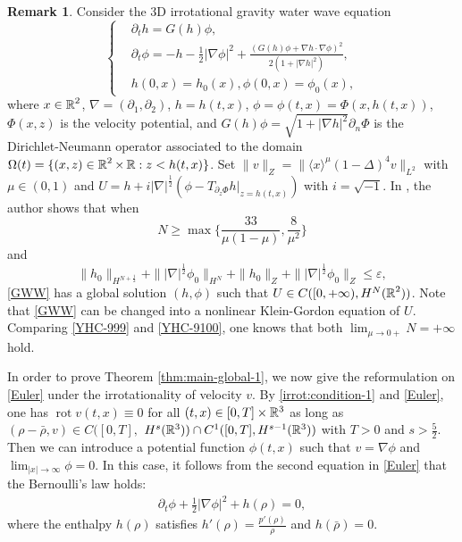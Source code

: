 \documentclass[11pt,twoside]{article}
\def\na{\nabla}
\def\R{\mathop{\mathbb R\kern 0pt}\nolimits}
\def\ds{\displaystyle}
\def\f{\frac}
\def\p{\partial}
\def\ve{\varepsilon}
\newcommand{\w}[1]{\langle {#1} \rangle}
\DeclareMathOperator{\rot}{rot}
\theoremstyle{plain}
\theoremstyle{definition}
\theoremstyle{assumption}
\newtheorem{remark}{Remark}[section]
\numberwithin{equation}{section}
\begin{document}
\begin{remark}\label{YHC-90E}
Consider the 3D irrotational gravity water wave equation
\begin{equation}\label{GWW}
\left\{
\begin{aligned}
&\p_th=G(h)\phi,\\
&\p_t\phi=-h-\frac12|\nabla\phi|^2
+\frac{(G(h)\phi+\nabla h\cdot\nabla\phi)^2}{2(1+|\nabla h|^2)},\\
&h(0,x)=h_0(x), \phi(0,x)=\phi_0(x),
\end{aligned}
\right.
\end{equation}
where $x\in\R^2$, $\nabla=(\p_1,\p_2)$, $h=h(t,x)$, $\phi=\phi(t,x)=\Phi(x,h(t,x))$, $\Phi(x,z)$
is the velocity potential, and $G(h)\phi=\sqrt{1+|\na h|^2}\p_n\Phi$
is the Dirichlet-Neumann operator associated to the domain $\Omega(t)=\{(x,z)\in\R^2\times\R: z<h(t,x)\}$.
Set $\|v\|_Z=\|\w{x}^\mu (1-\Delta)^4v\|_{L^2}$ with $\mu\in (0,1)$ and $U=h+i|\na|^{\f12}(\phi-T_{\p_z\Phi}h|_{z=h(t,x)})$
with $i=\sqrt{-1}$. In \cite{Zheng22}, the author shows that when
\begin{equation}\label{YHC-9100}
N\ge\max\{\frac{33}{\mu(1-\mu)},\f{8}{\mu^2}\}
\end{equation}
and
\begin{equation*}\label{YHC-9100A}
\|h_0\|_{H^{N+\frac12}}+\||\nabla|^{\f12}\phi_0\|_{H^N}
+\|h_0\|_Z+\||\nabla|^{\frac12}\phi_0\|_Z\le\ve,
\end{equation*}
\eqref{GWW} has a global solution $(h, \phi)$ such that $U\in C([0, +\infty), H^N(\R^2))$.
Note that \eqref{GWW} can be changed into a nonlinear Klein-Gordon equation of $U$.
Comparing \eqref{YHC-999} and \eqref{YHC-9100}, one knows that both $\ds\lim_{\mu\to 0+}N=+\infty$ hold.

\end{remark}










In order to prove Theorem \ref{thm:main-global-1}, we now give the reformulation on \eqref{Euler}
under the irrotationality of velocity $v$.
By \eqref{irrot:condition-1} and \eqref{Euler}, one has $\rot v(t,x)\equiv 0$ for all
$(t,x)\in [0, T]\times\Bbb R^3$ as long as $(\rho-\bar\rho, v)\in C([0, T],$ $H^s(\Bbb R^3))\cap C^1([0,T], H^{s-1}(\Bbb R^3))$
with $T>0$ and $s>\f52$. Then we can introduce a potential function $\phi(t,x)$ such that $v=\nabla\phi$ and $\ds\lim_{|x|\to\infty}\phi=0$.
In this case,
it follows from the second equation in \eqref{Euler} that the
	Bernoulli's law holds:
\begin{equation}\label{YHC-2}
\begin{split}
\p_t\phi+\frac12|\nabla\phi|^2+h(\rho)=0,
\end{split}
\end{equation}
where the enthalpy $h(\rho)$ satisfies $h'(\rho)=\frac{p'(\rho)}\rho$ and $h(\bar\rho)=0$.
\end{document}
